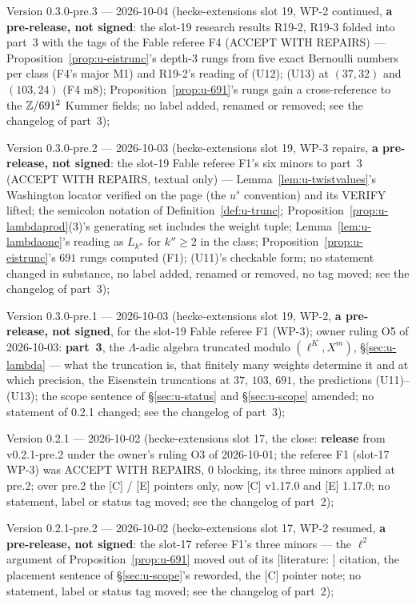 \documentclass[11pt]{article}
\newcommand{\LIT}[1]{\textsf{[literature: #1]}}   %
\newcommand{\VERIFYloc}{\textsf{VERIFY}}          %
\newcommand{\Iw}{\Lambda}                         %
\begin{document}
Version 0.3.0-pre.3 --- 2026-10-04 (hecke-extensions slot 19, WP-2 continued, \textbf{a pre-release, not signed}: the slot-19 research results R19-2,
R19-3 folded into part~3 with the tags of the Fable referee F4 (ACCEPT WITH REPAIRS) --- Proposition~\ref{prop:u-eistrunc}'s depth-$3$ rungs \PROVED{} from five exact
Bernoulli numbers per class (F4's major M1) and R19-2's \COMP{} reading of (U12); (U13) \PROVED{} at $(37,32)$ and $(103,24)$ (F4 m8); Proposition~\ref{prop:u-691}'s
rungs gain a cross-reference to the $\mathbb{Z}/691^{2}$ Kummer fields; no label added, renamed or removed; see the changelog of part~3);

Version 0.3.0-pre.2 --- 2026-10-03 (hecke-extensions slot 19, WP-3 repairs, \textbf{a pre-release, not signed}: the slot-19 Fable referee F1's
six minors to part~3 (ACCEPT WITH REPAIRS, textual only) --- Lemma~\ref{lem:u-twistvalues}'s Washington locator verified on the page (the $u^{s}$ convention) and its
\VERIFYloc{} lifted; the semicolon notation of Definition~\ref{def:u-trunc}; Proposition~\ref{prop:u-lambdaprod}(3)'s generating set includes the weight tuple;
Lemma~\ref{lem:u-lambdaone}'s reading as $L_{k''}$ for $k''\ge2$ in the class; Proposition~\ref{prop:u-eistrunc}'s $691$ rungs computed (F1); (U11)'s checkable form;
no statement changed in substance, no label added, renamed or removed, no tag moved; see the changelog of part~3);

Version 0.3.0-pre.1 --- 2026-10-03 (hecke-extensions slot 19, WP-2, \textbf{a pre-release, not signed}, for the slot-19 Fable referee F1 (WP-3);
owner ruling O5 of 2026-10-03: \textbf{part~3}, the $\Iw$-adic algebra truncated modulo $(\ell^{K},X^{m})$, \S\ref{sec:u-lambda} --- what the truncation is, that
finitely many weights determine it and at which precision, the Eisenstein truncations at $37$, $103$, $691$, the predictions (U11)--(U13); the scope sentence of
\S\ref{sec:u-status} and \S\ref{sec:u-scope} amended; no statement of 0.2.1 changed; see the changelog of part~3);

Version 0.2.1 --- 2026-10-02 (hecke-extensions slot 17, the close: \textbf{release} from v0.2.1-pre.2 under the owner's ruling O3 of
2026-10-01; the referee F1 (slot-17 WP-3) was ACCEPT WITH REPAIRS, $0$ blocking, its three minors applied at pre.2; over pre.2 the [C] / [E] pointers only, now
[C] v1.17.0 and [E] 1.17.0; no statement, label or status tag moved; see the changelog of part~2);

Version 0.2.1-pre.2 --- 2026-10-02 (hecke-extensions slot 17, WP-2 resumed, \textbf{a pre-release, not signed}: the slot-17 referee F1's three minors
--- the $\ell^{2}$ argument of Proposition~\ref{prop:u-691} moved out of its \LIT{} citation, the placement sentence of \S\ref{sec:u-scope}'s \COMP{} reworded, the [C]
pointer note; no statement, label or status tag moved; see the changelog of part~2);
\end{document}
